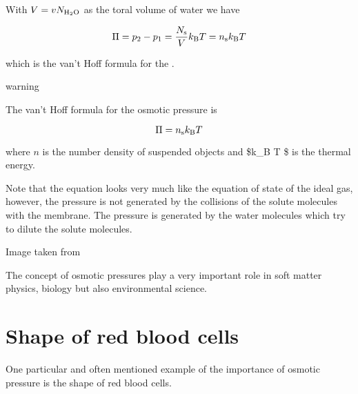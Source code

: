\documentclass[letterpaper,10pt,english]{sphinxmanual}
\let\sphinxpxdimen\pdfpxdimen\else\newdimen\sphinxpxdimen
\begin{document}
\sphinxAtStartPar
With \(V=v N_{\rm H_2O}\) as the toral volume of water we have

\sphinxAtStartPar
\begin{equation}
\Pi =p_2-p_1=\frac{N_{\rm s}}{V}k_{\rm B} T = n_{\rm s}k_{\rm B} T
\end{equation}

\sphinxAtStartPar
which is the van’t Hoff formula for the .

\begin{sphinxadmonition}{warning}{}\unskip
\sphinxAtStartPar
{}

\sphinxAtStartPar
The van’t Hoff formula for the osmotic pressure is

\sphinxAtStartPar
\begin{equation}
\Pi = n_{\rm s}k_{\rm B} T
\end{equation}

\sphinxAtStartPar
where \(n\) is the number density of suspended objects and \$k\_B T \$ is the thermal energy.
\end{sphinxadmonition}

\sphinxAtStartPar
Note that the equation looks very much like the equation of state of the ideal gas, however, the pressure is not generated by the collisions of the solute molecules with the membrane. The pressure is generated by the water molecules which try to dilute the solute molecules.

\noindent\sphinxincludegraphics[width=824\sphinxpxdimen,height=339\sphinxpxdimen]{{osmotic_pressure}.jpeg}

\sphinxAtStartPar
Image taken from 

\sphinxAtStartPar
The concept of osmotic pressures play a very important role in soft matter physics, biology but also environmental science.


\section{Shape of red blood cells}
\label{\detokenize{notebooks/L4/1_Osmotic_Pressure:Shape-of-red-blood-cells}}
\sphinxAtStartPar
One particular and often mentioned example of the importance of osmotic pressure is the shape of red blood cells.
\end{document}
